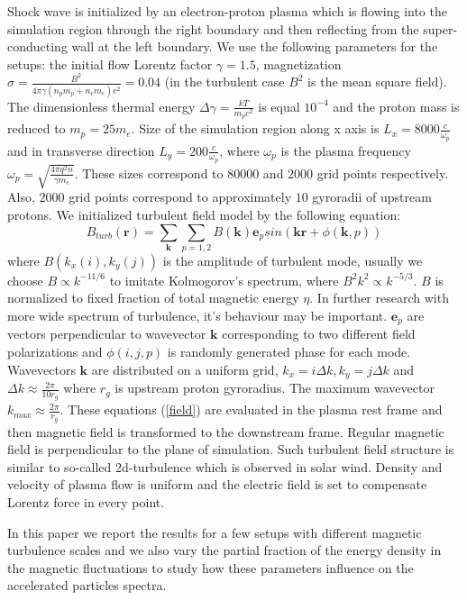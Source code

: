 \documentclass[a4paper]{jpconf}
\begin{document}
Shock wave is initialized by an electron-proton plasma which is flowing into the simulation region through the right boundary and then reflecting from 
the super-conducting wall at the left boundary. We use the following parameters for the setups: the initial flow Lorentz factor $\gamma = 1.5$, magnetization $\sigma = \frac{B^2}{4\pi\gamma (n_p m_p + n_e m_e) c^2} = 0.04$ (in the turbulent case $B^2$ is the mean square field). The dimensionless thermal energy $\Delta \gamma = \frac{k T}{m_p c^2}$ is equal $10^{-4}$ and the proton mass is reduced to $m_p = 25 m_e$. Size of the simulation region along x axis is $L_x = 8000\frac{c}{\omega_p}$ and in transverse direction $L_y = 200\frac{c}{\omega_p}$, where $\omega_p$ is the plasma frequency $\omega_p = \sqrt{\frac{4\pi q^2 n}{\gamma m_e}}$. These sizes correspond to $80000$ and $2000$ grid points respectively. Also, $2000$ grid points correspond to approximately $10$ gyroradii of upstream protons.
We initialized turbulent field model by the following equation: 
\begin{equation}\label{field}
B_{turb} (\textbf{r}) = \sum_{\textbf{k}}\sum_{p=1,2}B(\textbf{k}) \textbf{e}_{p} sin(\textbf{k}\textbf{r}  + \phi (\textbf{k},p))
\end{equation}
where $B(k_x(i),k_y(j))$ is the amplitude of turbulent mode, usually we choose $B \propto k^{-11/6}$ to imitate Kolmogorov's spectrum, where $B^2 k^2 \propto k^{-5/3}$. $B$ is normalized to fixed fraction of total magnetic energy $\eta$. In further research with more wide spectrum of turbulence, it's behaviour may be important. $\textbf{e}_{p}$ are vectors perpendicular to wavevector $\textbf{k}$ corresponding to two different field polarizations and $\phi (i,j,p)$ is randomly generated phase for each mode. Wavevectors $\textbf{k}$ are distributed on a uniform grid, $k_x = i \Delta k, k_y = j \Delta k$ and $\Delta k \approx \frac{2 \pi}{10 r_g}$ where $r_g$ is upstream proton gyroradius. The maximum wavevector $k_{max} \approx \frac{2 \pi}{r_g}$. These equations (\ref{field}) are evaluated in the plasma rest frame and then magnetic field is transformed to the downstream frame. Regular magnetic field is perpendicular to the plane of simulation. Such turbulent field structure is similar to so-called 2d-turbulence which is observed in solar wind\cite{Matthaeus1990}. Density and velocity of plasma flow is uniform and the electric field is set to compensate Lorentz force in every point.

In this paper we report the results for a few setups with different magnetic turbulence scales and we also vary the partial fraction of the energy density 
in the magnetic fluctuations to study how these parameters influence on the accelerated particles spectra.
\end{document}
